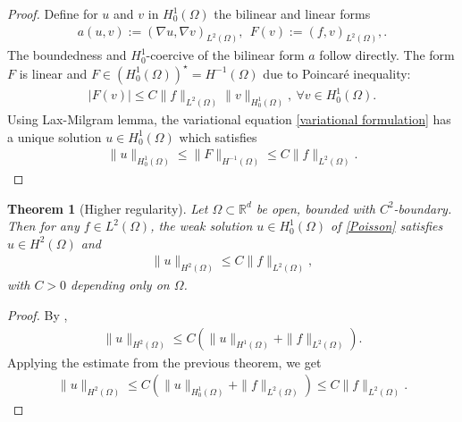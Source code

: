 \documentclass[oneside,11pt]{book}
\numberwithin{equation}{section}
\newtheorem{theorem}{Theorem}[section]
\begin{document}
\begin{proof}
    Define for $u$ and $v$ in $H_0^1(\Omega)$ the bilinear and linear forms
    \begin{align}
        a(u,v) := (\nabla u,\nabla v)_{L^2(\Omega)},\ \ F(v) := (f,v)_{L^2(\Omega)},.
    \end{align}
    The boundedness and $H_0^1$-coercive of the bilinear form $a$ follow directly.
    The form $F$ is linear and $F\in (H_0^1(\Omega))^\star = H^{-1}(\Omega)$ due to Poincar\'e inequality:
    \begin{align}
        |F(v)|\le C\|f\|_{L^2(\Omega)}\|v\|_{H_0^1(\Omega)},\ \forall v\in H_0^1(\Omega).
    \end{align}
    Using Lax-Milgram lemma, the variational equation \eqref{variational formulation} has a unique solution $u\in H_0^1(\Omega)$ which satisfies
    \begin{align}
        \|u\|_{H_0^1(\Omega)}\le\|F\|_{H^{-1}(\Omega)}\le C\|f\|_{L^2(\Omega)}.
    \end{align}
\end{proof}

\begin{theorem}[Higher regularity]
    \label{theorem higher regularity}
    Let $\Omega\subset\mathbb{R}^d$ be open, bounded with $C^2$-boundary. Then for any $f\in L^2(\Omega)$, the weak solution $u\in H_0^1(\Omega)$ of \eqref{Poisson} satisfies $u\in H^2(\Omega)$ and
    \begin{align}
        \|u\|_{H^2(\Omega)}\le C\|f\|_{L^2(\Omega)},
    \end{align}
    with $C > 0$ depending only on $\Omega$.
\end{theorem}

\begin{proof}
    By \cite{Alt2016},
    \begin{align}
        \|u\|_{H^2(\Omega)}\le C\left(\|u\|_{H^1(\Omega)} + \|f\|_{L^2(\Omega)}\right).
    \end{align}
    Applying the estimate from the previous theorem, we get
    \begin{align}
        \|u\|_{H^2(\Omega)}\le C\left(\|u\|_{H_0^1(\Omega)} + \|f\|_{L^2(\Omega)}\right)\le C\|f\|_{L^2(\Omega)}.
    \end{align}
\end{proof}
\end{document}
